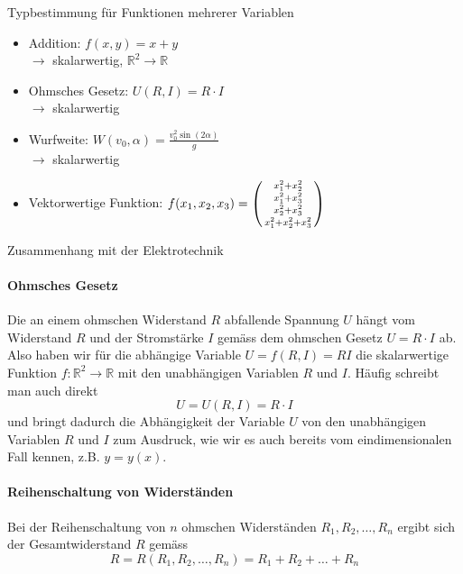 \begin{example2}{Typbestimmung für Funktionen mehrerer Variablen}
    \begin{itemize}
        \item Addition: $f(x,y) = x + y$ \\ $\rightarrow$ skalarwertig, $\mathbb{R}^2 \rightarrow \mathbb{R}$
        \item Ohmsches Gesetz: $U(R,I) = R \cdot I$ \\ $\rightarrow$ skalarwertig
        \item Wurfweite: $W(v_0, \alpha) = \frac{v_0^2 \sin(2\alpha)}{g}$ \\ $\rightarrow$ skalarwertig
        \item Vektorwertige Funktion: $f(x_1, x_2, x_3) = \begin{psmallmatrix} x_1^2 + x_2^2 \\ x_1^2 + x_3^2 \\ x_2^2 + x_3^2 \\ x_1^2 + x_2^2 + x_3^2 \end{psmallmatrix}$
    \end{itemize}
    \end{example2}

    \begin{example2}{Zusammenhang mit der Elektrotechnik}
    \paragraph{Ohmsches Gesetz}
    Die an einem ohmschen Widerstand $R$ abfallende Spannung $U$ hängt vom Widerstand $R$ und der Stromstärke $I$ gemäss dem ohmschen Gesetz $U=R \cdot I$ ab. Also haben wir für die abhängige Variable $U=f(R, I)=R I$ die skalarwertige Funktion $f: \mathbb{R}^2 \longrightarrow \mathbb{R}$ mit den unabhängigen Variablen $R$ und $I$. Häufig schreibt man auch direkt
    $$
    U=U(R, I)=R \cdot I
    $$
    und bringt dadurch die Abhängigkeit der Variable $U$ von den unabhängigen Variablen $R$ und $I$ zum Ausdruck, wie wir es auch bereits vom eindimensionalen Fall kennen, z.B. $y=y(x)$.

    \paragraph{Reihenschaltung von Widerständen}
    Bei der Reihenschaltung von $n$ ohmschen Widerständen $R_1, R_2, \ldots, R_n$ ergibt sich der Gesamtwiderstand $R$ gemäss
    $$
    R=R(R_1, R_2, \ldots, R_n)=R_1+R_2+\ldots+R_n
    $$    
\end{example2}

